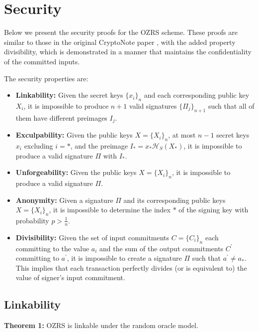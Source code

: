 \documentclass{article}
\newcommand{\sidx}{\ensuremath{*}}
\newcommand{\ix}{\ensuremath{x_i}}
\newcommand{\sx}{\ensuremath{x_\sidx}}
\newcommand{\ipk}{\ensuremath{X_i}}
\newcommand{\spk}{\ensuremath{X_\sidx}}
\newcommand{\iC}{\ensuremath{C_i}}
\newcommand{\oC}{\ensuremath{C^\prime}}
\newcommand{\hs}{\ensuremath{\mathcal{H}_S}}
\begin{document}
\section{Security}

Below we present the security proofs for the OZRS scheme.  These proofs are
similar to those in the original CryptoNote paper \cite{S13}, with the added
property divisibility, which is demonstrated in a manner that maintains the
confidentiality of the committed inputs.

The security properties are:
\begin{itemize}
  \item {\bf Linkability:} Given the secret keys $\{\ix\}_n$ and each
  corresponding public key {\ipk}, it is impossible to produce $n+1$ valid
  signatures $\{\Pi_j\}_{n+1}$ such that all of them have different preimages
  $I_j$.

  \item {\bf Exculpability:} Given the public keys $X=\{\ipk\}_n$, at most
  $n-1$ secret keys {\ix} excluding $i = *$, and the preimage $I_*=\sx
  \hs(\spk)$, it is impossible to produce a valid signature $\Pi$ with $I_*$.

  \item {\bf Unforgeability:} Given the public keys $X=\{\ipk\}_n$, it is
  impossible to produce a valid signature $\Pi$.
  
  \item {\bf Anonymity:} Given a signature $\Pi$ and its corresponding public
  keys $X=\{\ipk\}_n$, it is impossible to determine the index $*$ of the signing
  key with probability $p > \frac{1}{n}$.

  \item {\bf Divisibility:} Given the set of input commitments $C=\{\iC\}_n$
  each committing to the value $a_i$ and the sum of the output commitments {\oC}
  committing to $a^\prime$, it is impossible to create a signature $\Pi$ such
  that $a^\prime \neq a_*$.  This implies that each transaction perfectly
  divides (or is equivalent to) the value of signer's input commitment.

\end{itemize}

\subsection{Linkability}

{\bf Theorem 1:} OZRS is linkable under the random oracle model. \\
\end{document}
